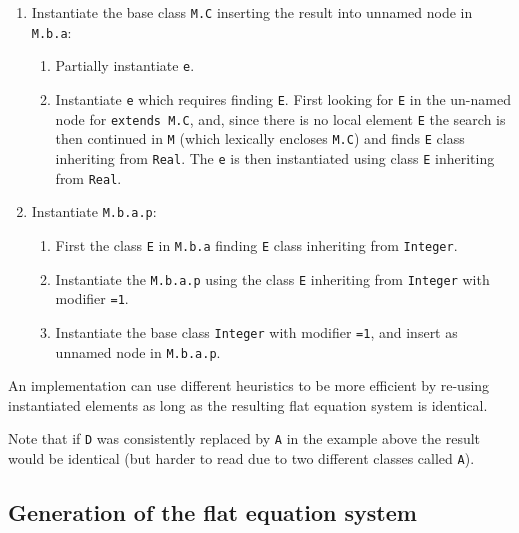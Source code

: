 \begin{example}
\begin{enumerate}
\begin{enumerate}
\begin{enumerate}
\begin{enumerate}
      \end{enumerate}
    \end{enumerate}
  \end{enumerate}
\item
  Instantiate the base class \lstinline!M.C! inserting the result into unnamed node in \lstinline!M.b.a!:
  \begin{enumerate}
  \item
    Partially instantiate \lstinline!e!.
  \item
    Instantiate \lstinline!e! which requires finding \lstinline!E!.
    First looking for \lstinline!E! in the un-named node for \lstinline!extends M.C!, and, since there is no local element \lstinline!E! the search is then continued in \lstinline!M! (which lexically encloses \lstinline!M.C!) and finds \lstinline!E! class inheriting from \lstinline!Real!.
    The \lstinline!e! is then instantiated using class \lstinline!E! inheriting from \lstinline!Real!.
  \end{enumerate}
\item
  Instantiate \lstinline!M.b.a.p!:
  \begin{enumerate}
  \item
    First the class \lstinline!E! in \lstinline!M.b.a! finding \lstinline!E! class inheriting from \lstinline!Integer!.
  \item
    Instantiate the \lstinline!M.b.a.p! using the class \lstinline!E! inheriting from \lstinline!Integer! with modifier \lstinline!=1!.
  \item
    Instantiate the base class \lstinline!Integer! with modifier \lstinline!=1!, and insert as unnamed node in \lstinline!M.b.a.p!.
  \end{enumerate}
\end{enumerate}

An implementation can use different heuristics to be more efficient by re-using instantiated elements as long as the resulting flat equation system is identical.

Note that if \lstinline!D! was consistently replaced by \lstinline!A! in the example above the result would be identical (but harder to read due to two different
classes called \lstinline!A!).
\end{example}

\subsection{Generation of the flat equation system}\label{generation-of-the-flat-equation-system}

